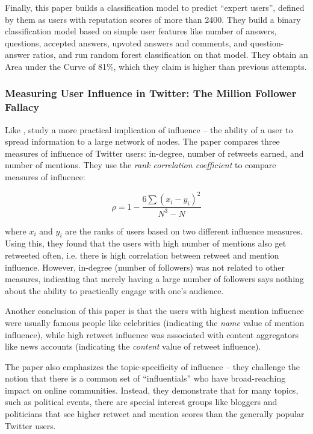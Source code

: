 \documentclass[10pt]{article}
\begin{document}
Finally, this paper builds a classification model to predict ``expert users'',
defined by them as users with reputation scores of more than 2400. They build a
binary classification model based on simple user features like number of answers,
questions, accepted answers, upvoted answers and comments, and question-answer
ratios, and run random forest classification on that model. They obtain an Area
under the Curve of 81\%, which they claim is higher than previous attempts.


\subsubsection{Measuring User Influence in Twitter: The Million Follower Fallacy
  \citep{cha2010measuring}}

Like \cite{bakshy2011everyone}, \citet{cha2010measuring} study a more practical
implication of influence -- the ability of a user to spread information to a
large network of nodes. The paper compares three measures of influence of
Twitter users: in-degree, number of retweets earned, and number of mentions.
They use the \textit{rank correlation coefficient} to compare measures of
influence:

\begin{equation}
  \rho = 1 - \frac{6\sum{(x_i - y_i)^2}}{N^3 - N}
\end{equation}

where $x_i$ and $y_i$ are the ranks of users based on two different influence
measures. Using this, they found that the users with high number of mentions
also get retweeted often, i.e. there is high correlation between retweet and
mention influence. However, in-degree (number of followers) was not related to
other measures, indicating that merely having a large number of followers says
nothing about the ability to practically engage with one's audience.

Another conclusion of this paper is that the users with highest mention
influence were usually famous people like celebrities (indicating the
\emph{name} value of mention influence), while high retweet influence was
associated with content aggregators like news accounts (indicating the
\emph{content} value of retweet influence).

The paper also emphasizes the topic-specificity of influence -- they challenge
the notion that there is a common set of ``influentials'' who have
broad-reaching impact on online communities. Instead, they demonstrate that for
many topics, such as political events, there are special interest groups like
bloggers and politicians that see higher retweet and mention scores than the
generally popular Twitter users.
\end{document}
